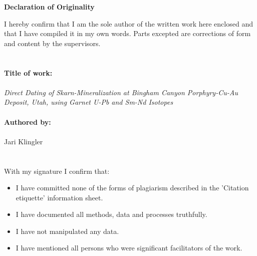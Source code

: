 \documentclass[a4paper,11pt,titlepage]{article}
\begin{document}
\maketitle

\newpage



\thispagestyle{empty} 
\vspace{0.5cm}
\begin{center}
\LARGE{\textbf{Declaration of Originality}} \\
\end{center}
\vspace{1.5cm}
\noindent I hereby confirm that I am the sole author of the written work here enclosed and that I have compiled it in my own words. Parts excepted are corrections of form and content by the supervisors. \\
\\
\\
\noindent \textbf{Title of work:}\\
\\
\textit{Direct Dating of Skarn-Mineralization at Bingham Canyon Porphyry-Cu-Au Deposit, Utah, using Garnet U-Pb and Sm-Nd Isotopes}
\\ \\
\noindent \textbf{Authored by:}\\
\\
Jari Klingler
\\
\\
\\
\noindent With my signature I confirm that:\\
\begin{itemize}
    \item I have committed none of the forms of plagiarism described in the 'Citation etiquette' information sheet.
    \item I have documented all methods, data and processes truthfully.
    \item I have not manipulated any data. 
    \item I have mentioned all persons who were significant facilitators of the work. 
\end{itemize}
\vspace{1.5cm}
 
\end{document}
